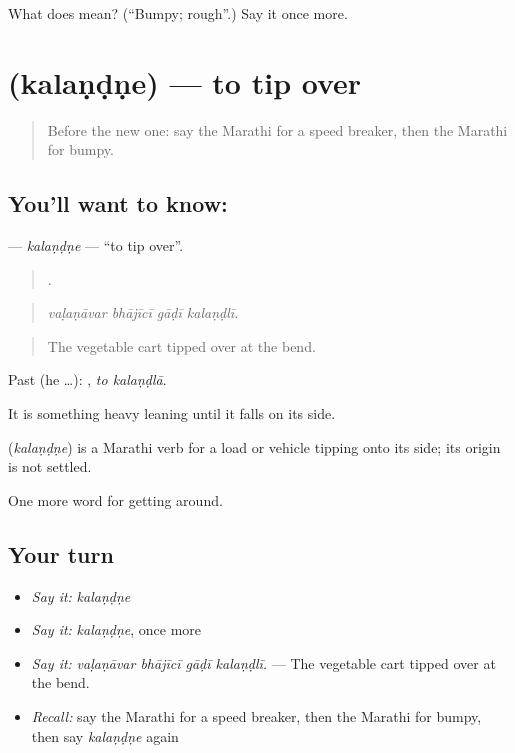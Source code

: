 \begin{tcolorbox}[breakable,colback=teal!4,colframe=teal!35!black,title={Before you move on}]
What does  mean? (\textquotedblleft{}Bumpy; rough\textquotedblright{}.) Say it once more.
\end{tcolorbox}
\section[\texorpdfstring{\mr{कलंडणे} (kalaṇḍṇe)}{कलंडणे (kalaṇḍṇe)}]{ (kalaṇḍṇe) — to tip over}

\label{lesson:MR-C403-kalandne}



\begin{quote}
Before the new one: say the Marathi for a speed breaker, then the Marathi for bumpy.
\end{quote}

\subsection*{You'll want to know: }
\textbf{} — \emph{kalaṇḍṇe} — \textquotedblleft{}to tip over\textquotedblright{}.

\begin{quote}
   .
\end{quote}

\begin{quote}
\emph{vaḷaṇāvar bhājīcī gāḍī kalaṇḍlī.}
\end{quote}

\begin{quote}
The vegetable cart tipped over at the bend.
\end{quote}

Past (he …):  , \emph{to kalaṇḍlā}.

It is something heavy leaning until it falls on its side.

\begin{cousinweb}
\textbf{} (\emph{kalaṇḍṇe}) is a Marathi verb for a load or vehicle tipping onto its side; its origin is not settled.
\end{cousinweb}

\begin{grammarlens}[title={What you've built}]
One more word for getting around.
\end{grammarlens}

\subsection*{Your turn}
\begin{itemize}
\raggedright
  \item \emph{Say it:} \emph{kalaṇḍṇe}
  \item \emph{Say it:} \emph{kalaṇḍṇe}, once more
  \item \emph{Say it:} \emph{vaḷaṇāvar bhājīcī gāḍī kalaṇḍlī.} — The vegetable cart tipped over at the bend.
  \item \emph{Recall:} say the Marathi for a speed breaker, then the Marathi for bumpy, then say \emph{kalaṇḍṇe} again
\end{itemize}

